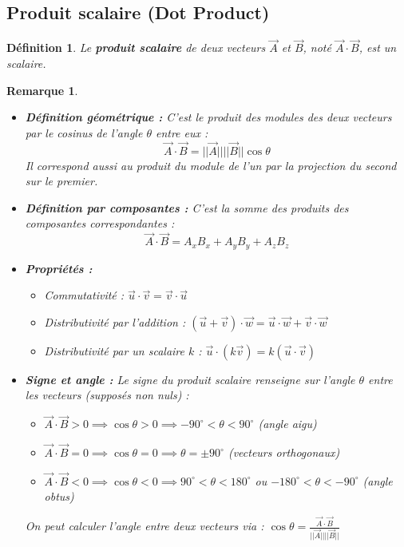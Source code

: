 \documentclass{article}
\newtheorem{definition}{Définition}
\newtheorem{remark}{Remarque}
\begin{document}
\subsection{Produit scalaire (Dot Product)}
\begin{definition}
Le \textbf{produit scalaire} de deux vecteurs $\vec{A}$ et $\vec{B}$, noté $\vec{A} \cdot \vec{B}$, est un scalaire.
\end{definition}
\begin{remark}
\begin{itemize}
    \item \textbf{Définition géométrique :} C'est le produit des modules des deux vecteurs par le cosinus de l'angle $\theta$ entre eux :
    \[ \vec{A} \cdot \vec{B} = ||\vec{A}|| ||\vec{B}|| \cos \theta \]
    Il correspond aussi au produit du module de l'un par la projection du second sur le premier.
    \item \textbf{Définition par composantes :} C'est la somme des produits des composantes correspondantes :
    \[ \vec{A} \cdot \vec{B} = A_x B_x + A_y B_y + A_z B_z \]
    \item \textbf{Propriétés :}
    \begin{itemize}
        \item Commutativité : $\vec{u} \cdot \vec{v} = \vec{v} \cdot \vec{u}$
        \item Distributivité par l'addition : $(\vec{u} + \vec{v}) \cdot \vec{w} = \vec{u} \cdot \vec{w} + \vec{v} \cdot \vec{w}$
        \item Distributivité par un scalaire $k$ : $\vec{u} \cdot (k \vec{v}) = k (\vec{u} \cdot \vec{v})$
    \end{itemize}
    \item \textbf{Signe et angle :} Le signe du produit scalaire renseigne sur l'angle $\theta$ entre les vecteurs (supposés non nuls) :
    \begin{itemize}
        \item $\vec{A} \cdot \vec{B} > 0 \implies \cos \theta > 0 \implies -90^\circ < \theta < 90^\circ$ (angle aigu)
        \item $\vec{A} \cdot \vec{B} = 0 \implies \cos \theta = 0 \implies \theta = \pm 90^\circ$ (vecteurs orthogonaux)
        \item $\vec{A} \cdot \vec{B} < 0 \implies \cos \theta < 0 \implies 90^\circ < \theta < 180^\circ$ ou $-180^\circ < \theta < -90^\circ$ (angle obtus)
    \end{itemize}
    On peut calculer l'angle entre deux vecteurs via : $\cos \theta = \frac{\vec{A} \cdot \vec{B}}{||\vec{A}|| ||\vec{B}||}$

\end{itemize}
\end{remark}
\end{document}
